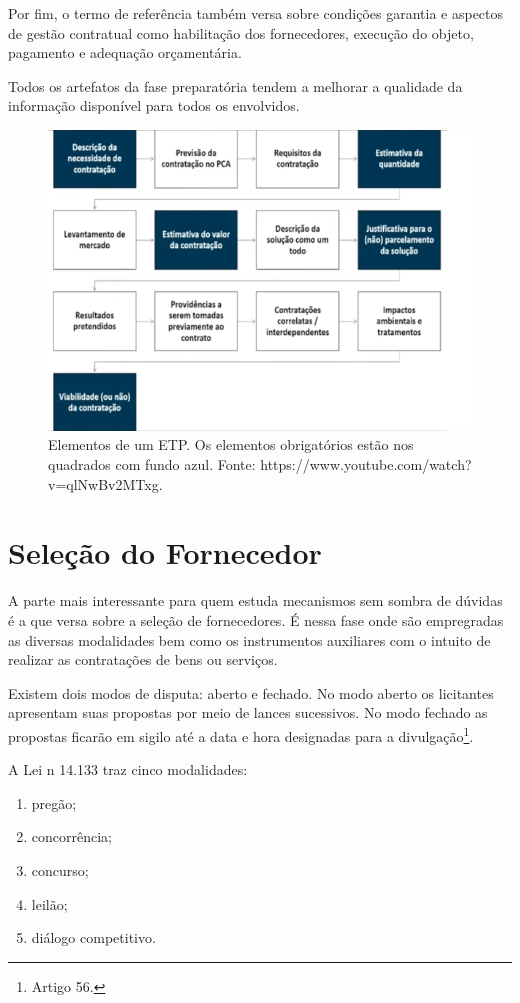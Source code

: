Por fim, o termo de referência também versa sobre condições garantia e aspectos de gestão contratual como habilitação dos fornecedores, execução do objeto, pagamento e adequação orçamentária.

Todos os artefatos da fase preparatória tendem a melhorar a qualidade da informação disponível para todos os envolvidos.

\begin{figure}
    \centering
    \includegraphics[scale=0.6]{conteudo/imagens/ETP.png}
    \caption{Elementos de um ETP. Os elementos obrigatórios estão nos quadrados com fundo azul. Fonte: https://www.youtube.com/watch?v=qlNwBv2MTxg.}
    \label{fig:ETP}
\end{figure}

\section{Seleção do Fornecedor}

A parte mais interessante para quem estuda mecanismos sem sombra de dúvidas é a que versa sobre a seleção de fornecedores. É nessa fase onde são empregradas as diversas modalidades bem como os instrumentos auxiliares com o intuito de realizar as contratações de bens ou serviços.

Existem dois modos de disputa: aberto e fechado. No modo aberto os licitantes apresentam suas propostas por meio de lances sucessivos. No modo fechado as propostas ficarão em sigilo até a data e hora designadas para a divulgação\footnote{Artigo 56.}.

A Lei n{\textordmasculine} 14.133 traz cinco modalidades:
\begin{enumerate}
    \item {pregão;}
    \item {concorrência;}
    \item {concurso;}
    \item {leilão;}
    \item {diálogo competitivo.}
\end{enumerate}


